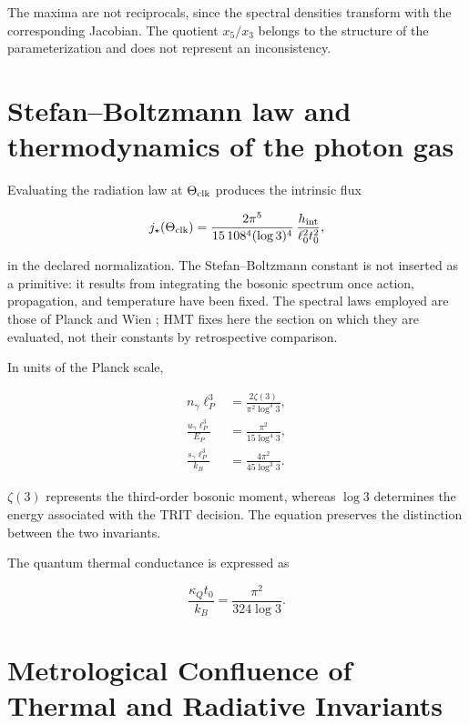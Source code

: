 The maxima are not reciprocals, since the spectral densities
transform with the corresponding Jacobian. The quotient \(x_5/x_3\)
belongs to the structure of the parameterization and does not represent an
inconsistency.

\section{Stefan--Boltzmann law and thermodynamics of the photon gas}

Evaluating the radiation law at \(\Theta_{\rm clk}\) produces the intrinsic flux

\begin{equation}
j_\star(\Theta_{\rm clk})
=\frac{2\pi^5}{15\,108^4(\log3)^4}\,
\frac{h_{\rm int}}{\ell_0^2t_0^2},
\label{eq:stefan-hmt}
\end{equation}

in the declared normalization. The Stefan--Boltzmann constant is not inserted as a primitive: it results from integrating the bosonic spectrum once action, propagation, and temperature have been fixed.
The spectral laws employed are those of Planck and Wien \cite{Planck,Wien}; HMT fixes here the section on which they are evaluated, not their constants by retrospective comparison.

In units of the Planck scale,

\begin{align}
n_\gamma\ell_P^3
&=\frac{2\zeta(3)}{\pi^2\log^3 3},
\label{eq:photon-number}\\
\frac{u_\gamma\ell_P^3}{E_P}
&=\frac{\pi^2}{15\log^4 3},
\label{eq:photon-energy}\\
\frac{s_\gamma\ell_P^3}{k_B}
&=\frac{4\pi^2}{45\log^3 3}.
\label{eq:photon-entropy}
\end{align}

\(\zeta(3)\) represents the third-order bosonic moment, whereas
\(\log3\) determines the energy associated with the TRIT decision. The equation preserves the
distinction between the two invariants.

The quantum thermal conductance is expressed as

\begin{equation}
\frac{\kappa_Qt_0}{k_B}=\frac{\pi^2}{324\log3}.
\label{eq:thermal-conductance}
\end{equation}

\section{Metrological Confluence of Thermal and Radiative Invariants}

